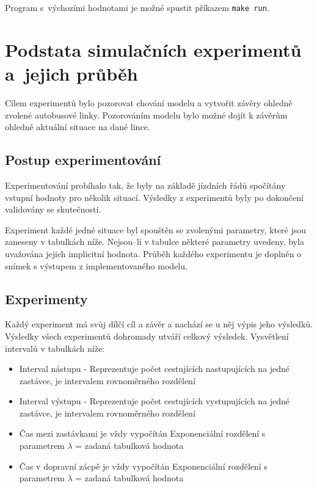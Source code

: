 \documentclass[a4paper]{article}
\begin{document}
            Program s~výchozími hodnotami je možné spustit příkazem \texttt{make run}.

    \section{Podstata simulačních experimentů a~jejich průběh}
    \label{sec:simulation}

        Cílem experimentů bylo pozorovat chování modelu a vytvořit závěry ohledně zvolené autobusové linky. Pozorováním modelu bylo možné dojít k závěrům ohledně aktuální situace na dané lince.
        \subsection{Postup experimentování}
        \label{subsec:experiments_methods}
			Experimentování probíhalo tak, že byly na základě jízdních řádů spočítány vstupní hodnoty pro několik situací. Výsledky z experimentů byly po dokončení validovány se skutečností.

            Experiment každé jedné situace byl spouštěn se zvolenými parametry, které jsou zaneseny v tabulkách níže. Nejsou--li v tabulce některé parametry uvedeny, byla uvažována jejich implicitní hodnota. Průběh každého experimentu je doplněn o snímek s výstupem z implementovaného modelu.
        \subsection{Experimenty}
        \label{subsec:experiments}

            Každý experiment má svůj dílčí cíl a závěr a nachází se u něj výpis jeho výsledků. Výsledky všech experimentů dohromady utváří celkový výsledek. Vysvětlení intervalů v tabulkách níže:
            \begin{itemize}
            	\item Interval nástupu - Reprezentuje počet cestujících nastupujících na jedné zastávce, je intervalem rovnoměrného rozdělení 
            	
            	\item Interval výstupu - Reprezentuje počet cestujících vystupujících na jedné zastávce, je intervalem rovnoměrného rozdělení 
            	
            	\item Čas mezi zastávkami je vždy vypočítán Exponenciální rozdělení s parametrem $\lambda$ = zadaná tabulková hodnota 
            	
            	\item Čas v dopravní zácpě je vždy vypočítán Exponenciální rozdělení s parametrem $\lambda$ = zadaná tabulková hodnota 
            \end{itemize}
			\newpage
\end{document}

